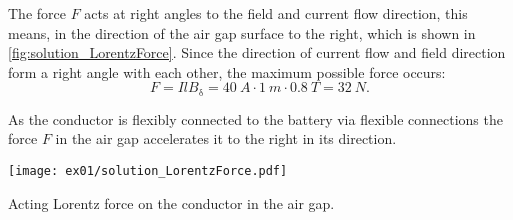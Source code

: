 
\begin{solutionblock}
    The force $F$ acts at right angles to the field and current flow direction, this means, in the direction of the air gap surface to the right, which is shown in \autoref{fig:solution_LorentzForce}. Since the direction of current flow and field direction form a right angle with each other, the maximum possible force occurs:
    \begin{equation}
        F = I l B_{\mathrm{\updelta}}
        = 40 \ \si{A} \cdot 1 \ \si{m} \cdot 0.8 \ \si{T}
        = 32 \ \si{N}.
    \end{equation}
    
    As the conductor is flexibly connected to the battery via flexible connections the force $F$ in the air gap accelerates it to the right in its direction.

    \begin{solutionfigure}[ht]
        \centering
        \texttt{[image: ex01/solution\_LorentzForce.pdf]}
        \caption{Acting Lorentz force on the conductor in the air gap.}
        \label{fig:solution_LorentzForce}
    \end{solutionfigure}

\end{solutionblock}




